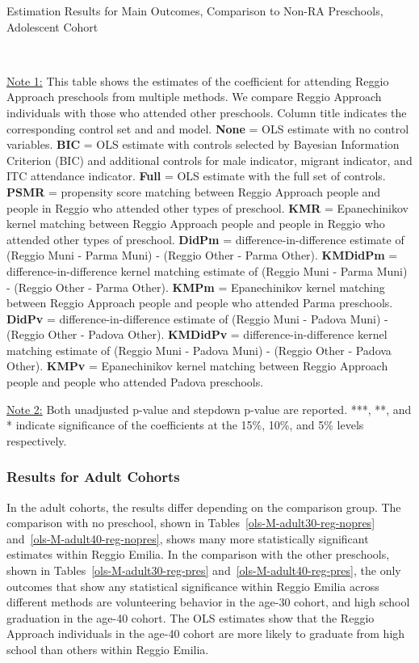 \begin{table}[H] \caption{Estimation Results for Main Outcomes, Comparison to Non-RA Preschools, Adolescent Cohort} \label{ols-M-adol-reg-pres}
\scalebox{0.6}{}
\vspace{1ex} \\
\footnotesize\raggedright{\underline{Note 1:} This table shows the estimates of the coefficient for attending Reggio Approach preschools from multiple methods. We compare Reggio Approach individuals with those who attended other preschools. Column title indicates the corresponding control set and and model. \textbf{None} = OLS estimate with no control variables. \textbf{BIC} = OLS estimate with controls selected by Bayesian Information Criterion (BIC) and additional controls for male indicator, migrant indicator, and ITC attendance indicator. \textbf{Full} = OLS estimate with the full set of controls. \textbf{PSMR} =  propensity score matching between Reggio Approach people and people in Reggio who attended other types of preschool. \textbf{KMR} = Epanechinikov kernel matching between Reggio Approach people and people in Reggio who attended other types of preschool. \textbf{DidPm} = difference-in-difference estimate of (Reggio Muni - Parma Muni) - (Reggio Other - Parma Other). \textbf{KMDidPm} = difference-in-difference kernel matching estimate of (Reggio Muni - Parma Muni) - (Reggio Other - Parma Other).   \textbf{KMPm} = Epanechinikov kernel matching between Reggio Approach people and people who attended Parma preschools. \textbf{DidPv} = difference-in-difference estimate of (Reggio Muni - Padova Muni) - (Reggio Other - Padova Other). \textbf{KMDidPv} = difference-in-difference kernel matching estimate of (Reggio Muni - Padova Muni) - (Reggio Other - Padova Other).  \textbf{KMPv} = Epanechinikov kernel matching between Reggio Approach people and people who attended Padova preschools.}

\footnotesize\raggedright{\underline{Note 2:} Both unadjusted p-value and stepdown p-value are reported. ***, **, and * indicate significance of the coefficients at the 15\%, 10\%, and 5\% levels respectively.}
\end{table}




\subsubsection{Results for Adult Cohorts}
In the adult cohorts, the results differ depending on the comparison group. The comparison with no preschool, shown in Tables~\ref{ols-M-adult30-reg-nopres} and~\ref{ols-M-adult40-reg-nopres}, shows many more statistically significant estimates within Reggio Emilia. In the comparison with the other preschools, shown in Tables~\ref{ols-M-adult30-reg-pres} and~\ref{ols-M-adult40-reg-pres}, the only outcomes that show any statistical significance within Reggio Emilia across different methods are volunteering behavior in the age-30 cohort, and high school graduation in the age-40 cohort. The OLS estimates show that the Reggio Approach individuals in the age-40 cohort are more likely to graduate from high school than others within Reggio Emilia.

